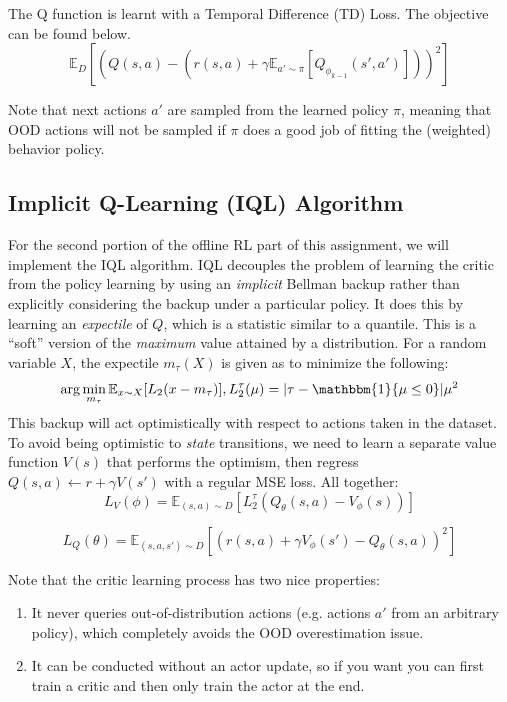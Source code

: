 \documentclass{article}
\begin{document}
The Q function is learnt with a Temporal Difference (TD) Loss. The objective can be found below.
\begin{equation}
    \mathbb{E}_{D}\left[\left(Q(s,a) - \left(r(s,a) + \gamma\mathbb{E}_{a' \sim \pi}[Q_{\phi_{k-1}}(s',a')]\right)\right)^2\right]
\end{equation}

Note that next actions $a'$ are sampled from the learned policy $\pi$, meaning that OOD actions will not be sampled if $\pi$ does a good job of fitting the (weighted) behavior policy.

\subsection{Implicit Q-Learning (IQL) Algorithm}

For the second portion of the offline RL part of this assignment, we will implement the IQL algorithm. IQL decouples the problem of learning the critic from the policy learning by using an \textit{implicit} Bellman backup rather than explicitly considering the backup under a particular policy. It does this by learning an \textit{expectile} of $Q$, which is a statistic similar to a quantile. This is a ``soft'' version of the \textit{maximum} value attained by a distribution. For a random variable $X$, the expectile $m_\tau(X)$ is given as to minimize the following:
\[\arg \min_{m_\tau} \mathbb{E}_{x \sim X}[L_2(x - m_\tau)], L_2^\tau(\mu) = |\tau - \mathbbm{1}\{ \mu \le 0 \} |\mu^2\]
This backup will act optimistically with respect to actions taken in the dataset. To avoid being optimistic to \textit{state} transitions, we need to learn a separate value function $V(s)$ that performs the optimism, then regress $Q(s, a) \gets r + \gamma V(s')$ with a regular MSE loss. All together:
\begin{equation}
    L_V(\phi) =  \mathbb{E}_{(s,a) \sim D}[L_2^\tau(Q_\theta(s,a) - V_\phi(s))]
\end{equation}

\begin{equation}
    L_Q(\theta) =  \mathbb{E}_{(s,a,s') \sim D}[(r(s,a) + \gamma V_\phi(s') - Q_\theta(s,a))^2]
\end{equation}

Note that the critic learning process has two nice properties:
\begin{enumerate}
    \item It never queries out-of-distribution actions (e.g. actions $a'$ from an arbitrary policy), which completely avoids the OOD overestimation issue.
    \item It can be conducted without an actor update, so if you want you can first train a critic and then only train the actor at the end.
\end{enumerate}
\end{document}
